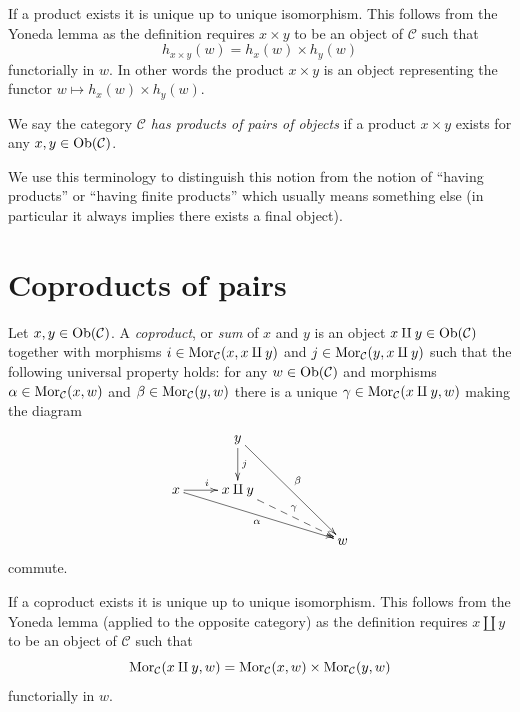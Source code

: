 \noindent
If a product exists it is unique up to unique
isomorphism. This follows from the Yoneda lemma as
the definition requires $x \times y$ to be an object
of $\mathcal{C}$ such that
$$
h_{x \times y}(w) = h_x(w) \times h_y(w)
$$
functorially in $w$. In other words the product $x \times y$
is an object representing the functor
$w \mapsto h_x(w) \times h_y(w)$.

\begin{definition}
\label{definition-has-products-of-pairs}
We say the category $\mathcal{C}$ {\it has products of pairs
of objects} if a product $x \times y$
exists for any $x, y \in \mathop{\mathrm{Ob}}\nolimits(\mathcal{C})$.
\end{definition}

\noindent
We use this terminology to distinguish this notion from the notion
of ``having products'' or ``having finite products'' which usually means
something else (in particular it always implies there exists a
final object).





\section{Coproducts of pairs}
\label{section-coproducts-pairs}

\begin{definition}
\label{definition-coproducts}
Let $x, y \in \mathop{\mathrm{Ob}}\nolimits(\mathcal{C})$.
A {\it coproduct}, or {\it sum} of $x$ and $y$ is
an object $x \amalg y \in \mathop{\mathrm{Ob}}\nolimits(\mathcal{C})$
together with morphisms
$i \in \mathop{\mathrm{Mor}}\nolimits_{\mathcal C}(x, x \amalg y)$ and
$j \in \mathop{\mathrm{Mor}}\nolimits_{\mathcal C}(y, x \amalg y)$ such
that the following universal property holds: for
any $w \in \mathop{\mathrm{Ob}}\nolimits(\mathcal{C})$ and morphisms
$\alpha \in \mathop{\mathrm{Mor}}\nolimits_{\mathcal C}(x, w)$ and
$\beta \in \mathop{\mathrm{Mor}}\nolimits_\mathcal{C}(y, w)$
there is a unique
$\gamma \in \mathop{\mathrm{Mor}}\nolimits_{\mathcal C}(x \amalg y, w)$ making
the diagram
$$
\xymatrix{
& y \ar[d]^j \ar[rrdd]^\beta \\
x \ar[r]^i \ar[rrrd]_\alpha & x \amalg y \ar@{-->}[rrd]^\gamma \\
& & & w
}
$$
commute.
\end{definition}

\noindent
If a coproduct exists it is unique up to unique
isomorphism. This follows from the Yoneda lemma (applied to the
opposite category) as
the definition requires $x \amalg y$ to be an object
of $\mathcal{C}$ such that
$$
\mathop{\mathrm{Mor}}\nolimits_\mathcal{C}(x \amalg y, w) =
\mathop{\mathrm{Mor}}\nolimits_\mathcal{C}(x, w) \times \mathop{\mathrm{Mor}}\nolimits_\mathcal{C}(y, w)
$$
functorially in $w$.

